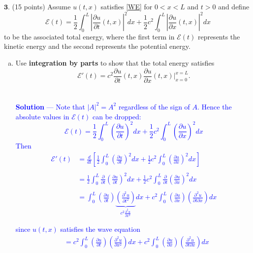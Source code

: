 \documentclass[12pt]{article}
\newcommand{\mcE}{\mathcal{E}}
\begin{document}
\vspace{0.2in}

\noindent $\textbf{3}$. (15 points) Assume $u(t,x)$ satisfies \eqref{WE} for $0 < x < L$ and $t > 0$
and define
$$\mcE(t) = \frac{1}{2} \int_0^L \left | \frac{\partial u}{\partial t}(t,x) \right |^2 dx + \frac{1}{2}c^2 \int_0^L \left |  \frac{\partial u}{\partial x}(t,x)  \right |^2  dx$$
to be the associated total energy, where the first term in $\mcE(t)$ represents the kinetic energy and the second represents the potential energy.
\begin{enumerate}[(a)]
\item Use \textbf{integration by parts} to show that the total energy satisfies
$$\mcE'(t) = c^2  \frac{\partial u}{\partial t}(t,x)  \frac{\partial u}{\partial x}(t,x)  \biggr \vert_{x=0}^{x=L}.$$ \\ \\
\textcolor{blue}{\textbf{Solution} — Note that $|A|^2 = A^2$ regardless of the sign of $A$. Hence the absolute values in $\mcE(t)$ can be dropped:
$$\mcE(t) = \frac{1}{2} \int_0^L \left( \frac{\partial u}{\partial t} \right)^2 dx + \frac{1}{2}c^2 \int_0^L \left( \frac{\partial u}{\partial x}\right)^2  dx$$
Then 
\begin{align*}
\mcE'(t) &= \frac{d}{dt} \left[ \frac{1}{2} \int_0^L \left( \frac{\partial u}{\partial t} \right)^2 dx + \frac{1}{2}c^2 \int_0^L \left( \frac{\partial u}{\partial x}\right)^2  dx \right] \\ \\
&=  \frac{1}{2} \int_0^L \frac{\partial}{\partial t}  \left( \frac{\partial u}{\partial t} \right)^2 dx + \frac{1}{2}c^2 \int_0^L \frac{\partial}{\partial t} \left( \frac{\partial u}{\partial x}\right)^2  dx \\ \\
&=  \int_0^L \left( \frac{\partial u}{\partial t} \right) \underbrace{\left( \frac{\partial^2 u}{\partial t^2} \right)}_{\text{$c^2 \frac{\partial^2 u}{\partial 
x^2}$}}  dx + c^2 \int_0^L\left( \frac{\partial u}{\partial x}\right) \left( \frac{\partial^2 u}{\partial t \partial x} \right)  dx \\ \\
\end{align*}
since $u(t,x)$ satisfies the wave equation
\begin{align*}
&=  c^2\int_0^L \left( \frac{\partial u}{\partial t} \right) \left( \frac{\partial^2 u}{\partial x^2} \right)  dx + c^2 \int_0^L\left( \frac{\partial u}{\partial x}\right) \left( \frac{\partial^2 u}{\partial t \partial x} \right)  dx \\

\end{align*}}
\end{enumerate}
\end{document}
